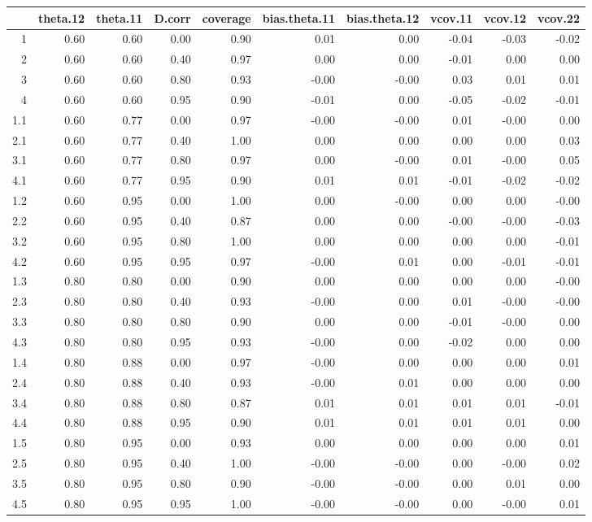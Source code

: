 \begin{tabular}{rrrrrrrrrr}
  \hline
 & theta.12 & theta.11 & D.corr & coverage & bias.theta.11 & bias.theta.12 & vcov.11 & vcov.12 & vcov.22 \\ 
  \hline
1 & 0.60 & 0.60 & 0.00 & 0.90 & 0.01 & 0.00 & -0.04 & -0.03 & -0.02 \\ 
  2 & 0.60 & 0.60 & 0.40 & 0.97 & 0.00 & 0.00 & -0.01 & 0.00 & 0.00 \\ 
  3 & 0.60 & 0.60 & 0.80 & 0.93 & -0.00 & -0.00 & 0.03 & 0.01 & 0.01 \\ 
  4 & 0.60 & 0.60 & 0.95 & 0.90 & -0.01 & 0.00 & -0.05 & -0.02 & -0.01 \\ 
  1.1 & 0.60 & 0.77 & 0.00 & 0.97 & -0.00 & -0.00 & 0.01 & -0.00 & 0.00 \\ 
  2.1 & 0.60 & 0.77 & 0.40 & 1.00 & 0.00 & 0.00 & 0.00 & 0.00 & 0.03 \\ 
  3.1 & 0.60 & 0.77 & 0.80 & 0.97 & 0.00 & -0.00 & 0.01 & -0.00 & 0.05 \\ 
  4.1 & 0.60 & 0.77 & 0.95 & 0.90 & 0.01 & 0.01 & -0.01 & -0.02 & -0.02 \\ 
  1.2 & 0.60 & 0.95 & 0.00 & 1.00 & 0.00 & -0.00 & 0.00 & 0.00 & -0.00 \\ 
  2.2 & 0.60 & 0.95 & 0.40 & 0.87 & 0.00 & 0.00 & -0.00 & -0.00 & -0.03 \\ 
  3.2 & 0.60 & 0.95 & 0.80 & 1.00 & 0.00 & 0.00 & 0.00 & 0.00 & -0.01 \\ 
  4.2 & 0.60 & 0.95 & 0.95 & 0.97 & -0.00 & 0.01 & 0.00 & -0.01 & -0.01 \\ 
  1.3 & 0.80 & 0.80 & 0.00 & 0.90 & 0.00 & 0.00 & 0.00 & 0.00 & -0.00 \\ 
  2.3 & 0.80 & 0.80 & 0.40 & 0.93 & -0.00 & 0.00 & 0.01 & -0.00 & -0.00 \\ 
  3.3 & 0.80 & 0.80 & 0.80 & 0.90 & 0.00 & 0.00 & -0.01 & -0.00 & 0.00 \\ 
  4.3 & 0.80 & 0.80 & 0.95 & 0.93 & -0.00 & 0.00 & -0.02 & 0.00 & 0.00 \\ 
  1.4 & 0.80 & 0.88 & 0.00 & 0.97 & -0.00 & 0.00 & 0.00 & 0.00 & 0.01 \\ 
  2.4 & 0.80 & 0.88 & 0.40 & 0.93 & -0.00 & 0.01 & 0.00 & 0.00 & 0.00 \\ 
  3.4 & 0.80 & 0.88 & 0.80 & 0.87 & 0.01 & 0.01 & 0.01 & 0.01 & -0.01 \\ 
  4.4 & 0.80 & 0.88 & 0.95 & 0.90 & 0.01 & 0.01 & 0.01 & 0.01 & 0.00 \\ 
  1.5 & 0.80 & 0.95 & 0.00 & 0.93 & 0.00 & 0.00 & 0.00 & 0.00 & 0.01 \\ 
  2.5 & 0.80 & 0.95 & 0.40 & 1.00 & -0.00 & -0.00 & 0.00 & -0.00 & 0.02 \\ 
  3.5 & 0.80 & 0.95 & 0.80 & 0.90 & -0.00 & -0.00 & 0.00 & 0.01 & 0.00 \\ 
  4.5 & 0.80 & 0.95 & 0.95 & 1.00 & -0.00 & -0.00 & 0.00 & -0.00 & 0.01 \\ 
   \hline
\end{tabular}
